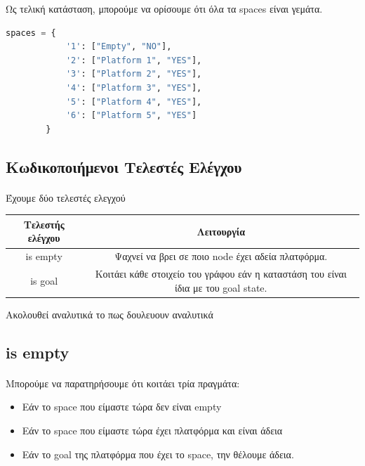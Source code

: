 \documentclass{article}
\begin{document}
    Ως τελική κατάσταση, μπορούμε να ορίσουμε ότι όλα τα spaces είναι γεμάτα. 

    \begin{lstlisting}[language=Python]
        spaces = {
            '1': ["Empty", "NO"],
            '2': ["Platform 1", "YES"],
            '3': ["Platform 2", "YES"],
            '4': ["Platform 3", "YES"],
            '5': ["Platform 4", "YES"],
            '6': ["Platform 5", "YES"]
        }
    \end{lstlisting}

    \newpage
    \subsection{Κωδικοποιήμενοι Τελεστές Ελέγχου}
    \paragraph{}
    Έχουμε δύο τελεστές ελεγχού

    \begin{center}
        \begin{tabular}{|c|c|}
            \hline
            Τελεστής ελέγχου & Λειτουργία \\
            \hline
            is empty & Ψαχνεί να βρει σε ποιο node έχει αδεία πλατφόρμα. \\
            \hline
            is goal & Κοιτάει κάθε στοιχείο του γράφου εάν η καταστάση του είναι ίδια με του goal state. \\
            \hline
        \end{tabular}
    \end{center}

    Ακολουθεί αναλυτικά το πως δουλευουν αναλυτικά

    \subsection{is empty}

    

    \paragraph{}
    Μπορούμε να παρατηρήσουμε ότι κοιτάει τρία πραγμάτα:

    \begin{itemize}
        \item Εάν το space που είμαστε τώρα δεν είναι empty
        \item Εάν το space που είμαστε τώρα έχει πλατφόρμα και είναι άδεια
        \item Εάν το goal της πλατφόρμα που έχει το space, την θέλουμε άδεια.
    \end{itemize}
\end{document}
